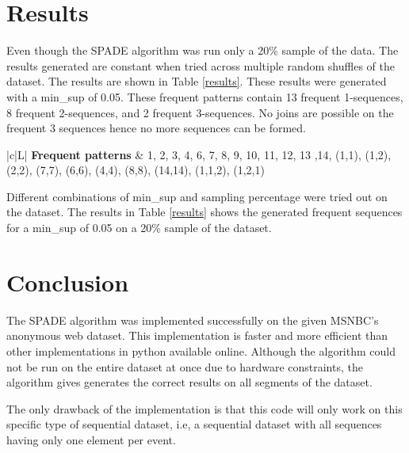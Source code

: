 \section{Results}

Even though the SPADE algorithm was run only a 20\% sample of the data. The results generated are constant when tried across multiple random shuffles of the dataset. The results are shown in Table \ref{results}. These results were generated with a min\_sup of 0.05. These frequent patterns contain 13 frequent 1-sequences, 8 frequent 2-sequences, and 2 frequent 3-sequences. No joins are possible on the frequent 3 sequences hence no more sequences can be formed.

\begin{table}[htbp]
    \caption{Frequent patterns generated by SPADE}
    \label{results}
    \begin{center}
        \begin{tabular}{|c|L|}
            \hline
            \textbf{Frequent patterns} & 1, 2, 3, 4, 6, 7, 8, 9, 10, 11, 12, 13 ,14, (1,1), (1,2), (2,2), (7,7), (6,6), (4,4), (8,8), (14,14), (1,1,2), (1,2,1) \\
            \hline
        \end{tabular}
    \end{center}
\end{table}

Different combinations of min\_sup and sampling percentage were tried out on the dataset. The results in Table \ref{results} shows the generated frequent sequences for a min\_sup of 0.05 on a 20\% sample of the dataset.

\section{Conclusion}

The SPADE algorithm was implemented successfully on the given MSNBC's anonymous web dataset. This implementation is faster and more efficient than other implementations in python available online. Although the algorithm could not be run on the entire dataset at once due to hardware constraints, the algorithm gives generates the correct results on all segments of the dataset.

The only drawback of the implementation is that this code will only work on this specific type of sequential dataset, i.e, a sequential dataset with all sequences having only one element per event.